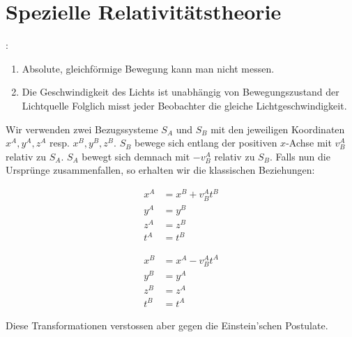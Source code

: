 \section{Spezielle Relativitätstheorie}

\vspace{1\baselineskip}

:
\begin{enumerate}
    \item Absolute, gleichförmige Bewegung kann man nicht messen.
    \item Die Geschwindigkeit des Lichts ist unabhängig von Bewegungszustand der Lichtquelle
            Folglich misst jeder Beobachter die gleiche Lichtgeschwindigkeit.
\end{enumerate}

\vspace{1\baselineskip}


Wir verwenden zwei Bezugssysteme $S_A$ und $S_B$ mit den jeweiligen Koordinaten
$x^A , y^A , z^A$ resp. $x^B , y^B , z^B$. $S_B$ bewege sich entlang der positiven
$x$-Achse mit $v_B^A$ relativ zu $S_A$. $S_A$ bewegt sich demnach mit $-v_B^A$ relativ zu
$S_B$. Falls nun die Ursprünge zusammenfallen, so erhalten wir die klassischen Beziehungen:

\begin{minipage}{0.25\textwidth}
    \begin{align*}
        x^A &= x^B + v_B^A t^B \\
        y^A &= y^B \\
        z^A &= z^B \\
        t^A &= t^B
    \end{align*}
\end{minipage}
\begin{minipage}{0.25\textwidth}
    \begin{align*}
        x^B &= x^A - v_B^A t^A \\
        y^B &= y^A \\
        z^B &= z^A \\
        t^B &= t^A
    \end{align*}
\end{minipage}

\vspace{1\baselineskip}

Diese Transformationen verstossen aber gegen die Einstein'schen Postulate.

\pagebreak

